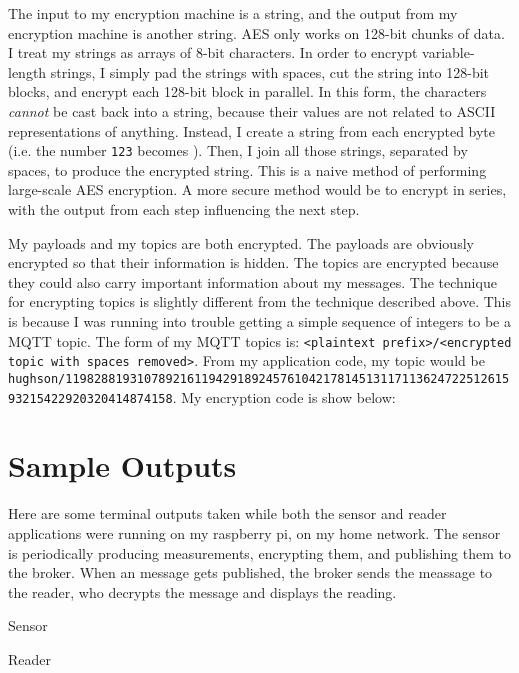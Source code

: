 \documentclass[final,titlepage,onecolumn]{article}
\begin{document}
The input to my encryption machine is a string, and the output from my encryption machine is another string. AES only works on 128-bit chunks of data. I treat my strings as arrays of 8-bit characters.  In order to encrypt variable-length strings, I simply pad the strings with spaces, cut the string into 128-bit blocks, and encrypt each 128-bit block in parallel. In this form, the characters \emph{cannot} be cast back into a string, because their values are not related to ASCII representations of anything. Instead, I create a string from each encrypted byte (i.e. the number \texttt{123} becomes ). Then, I join all those strings, separated by spaces, to produce the encrypted string. This is a naive method of performing large-scale AES encryption. A more secure method would be to encrypt in series, with the output from each step influencing the next step.

My payloads and my topics are both encrypted. The payloads are obviously encrypted so that their information is hidden. The topics are encrypted because they could also carry important information about my messages. The technique for encrypting topics is slightly different from the technique described above. This is because I was running into trouble getting a simple sequence of integers to be a MQTT topic. The form of my MQTT topics is: \texttt{<plaintext prefix>/<encrypted topic with spaces removed>}. From my application code, my topic would be \texttt{hughson/1198288193107892161194291892457610421781451311711362472251261593215422920320414874158}. My encryption code is show below:
\lstset{style=Cpp}


\section{Sample Outputs}

Here are some terminal outputs taken while both the sensor and reader applications were running on my raspberry pi, on my home network. The sensor is periodically producing measurements, encrypting them, and publishing them to the broker. When an message gets published, the broker sends the meassage to the reader, who decrypts the message and displays the reading.

\begin{center}Sensor\end{center}
\lstset{style=None}


\begin{center}Reader\end{center}
\lstset{style=None}

\end{document}
